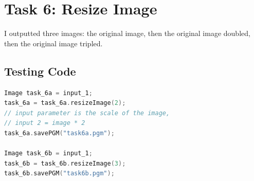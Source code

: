 \documentclass[pdftex,a4paper,10pt,titlepage]{article}
\begin{document}
\pagebreak

\section{Task 6: Resize Image}
I outputted three images: the original image, then the original image doubled, then the original image tripled.
\subsection{Testing Code}
\begin{lstlisting}[language=C++]
Image task_6a = input_1;
task_6a = task_6a.resizeImage(2);
// input parameter is the scale of the image, 
// input 2 = image * 2
task_6a.savePGM("task6a.pgm");

Image task_6b = input_1;
task_6b = task_6b.resizeImage(3);
task_6b.savePGM("task6b.pgm");
\end{lstlisting}
\end{document}
